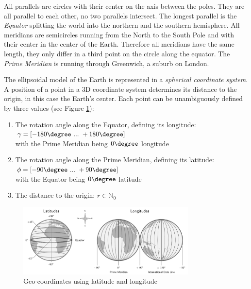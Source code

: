 All parallels are circles with their center on the axis between the poles. They are all parallel to each other, no two parallels intersect. The longest parallel is the \emph{Equator} splitting the world into the northern and the southern hemisphere.
All meridians are semicircles running from the North to the South Pole and with their center in the center of the Earth. Therefore all meridians have the same length, they only differ in a third point on the circle along the equator. The \emph{Prime Meridian} is running through Greenwich, a suburb on London.

The ellipsoidal model of the Earth is represented in a \emph{spherical coordinate system}. A position of a point in a 3D coordinate system determines its distance to the origin, in this case the Earth's center. Each point can be unambiguously defined by three values
(see Figure \ref{fig:geo-coordinates}):

\begin{enumerate}
  \item The rotation angle along the Equator, defining its longitude: $\gamma = [-180\degree ~...~ +180\degree]$ \\
  with the Prime Meridian being $0\degree$ longitude
  \item The rotation angle along the Prime Meridian, defining its latitude: $\phi = [-90\degree ~...~ +90\degree]$ \\
  with the Equator being $0\degree$ latitude
  \item The distance to the origin: $r \in \mathbb{N}_0$ \hfill
  \cite[pp. 26-28]{bolstad2008gis}
\end{enumerate}

\begin{figure}[ht]
  \centering
  \includegraphics[width=0.8\textwidth]{graphics/basics/geo-coordinates}
  \caption{Geo-coordinates using latitude and longitude}
  \label{fig:geo-coordinates}
\end{figure}


